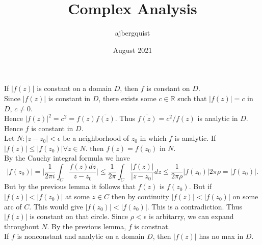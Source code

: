 \documentclass{article}
\title{Complex Analysis}
\author{ajbergquist }
\date{August 2021}
\theoremstyle{definition}
\newcommand{\R}{\mathbb{R}}
\begin{document}
 If $|f(z)|$ is constant on a domain $D$, then $f$ is constant on $D$. \\

 Since $|f(z)|$ is constant in $D$, there exists some $c\in \R$ such that $|f(z)| = c$ in $D$, $c\ne 0$.\\

Hence $|f(z)|^2 = c^2 = f(z)\overline{f(z)}$. Thus $\overline{f(z)} = c^2/f(z)$ is analytic in $D$. Hence $f$ is constant in $D$.\\

 Let $N:|z-z_0| < \epsilon$ be a neighborhood of $z_0$ in which $f$ is analytic. If $|f(z)|\le |f(z_0)|\forall z\in N$. then $f(z) = f(z_0)$ in $N$.\\

 By the Cauchy integral formula we have 
$$|f(z_0)| = \Big | \frac{1}{2\pi i}\int_C\frac{f(z)dz}{z-z_0}\Big |\le \frac{1}{2\pi}\int_C\frac{|f(z)|}{|z-z_0|}dz \le \frac{1}{2\pi \rho}|f(z_0)|2\pi \rho = |f(z_0)|.$$
But by the previous lemma it follows that $f(z)$ is $f(z_0)$. But if $|f(z)| < |f(z_0)|$ at some $z\in C$ then by continuity $|f(z)|<|f(z_0)|$ on some arc of $C$. This would give $|f(z_0)|< |f(z_0)|$. This is a contradiction. Thus $|f(z)|$ is constant on that circle. Since $\rho < \epsilon$ is arbitarry, we can expand throughout $N$. By the previous lemma, $f$ is constnat. \\

 If $f$ is nonconstant and analytic on a domain $D$, then $|f(z)|$ has no max in $D$. 
\end{document}
